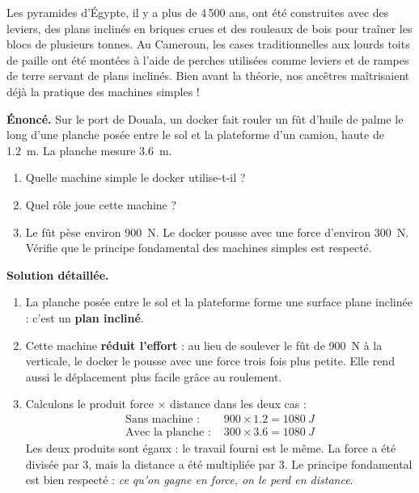 \documentclass[11pt]{article}
\begin{document}
\begin{savaistu}
Les pyramides d'Égypte, il y a plus de 4\,500 ans, ont été construites avec des leviers, des plans inclinés en briques crues et des rouleaux de bois pour traîner les blocs de plusieurs tonnes. Au Cameroun, les cases traditionnelles aux lourds toits de paille ont été montées à l'aide de perches utilisées comme leviers et de rampes de terre servant de plans inclinés. Bien avant la théorie, nos ancêtres maîtrisaient déjà la pratique des machines simples !
\end{savaistu}

\begin{exoresolu}
\textbf{Énoncé.} Sur le port de Douala, un docker fait rouler un fût d'huile de palme le long d'une planche posée entre le sol et la plateforme d'un camion, haute de \SI{1,2}{m}. La planche mesure \SI{3,6}{m}.
\begin{enumerate}
\item Quelle machine simple le docker utilise-t-il ?
\item Quel rôle joue cette machine ?
\item Le fût pèse environ \SI{900}{N}. Le docker pousse avec une force d'environ \SI{300}{N}. Vérifie que le principe fondamental des machines simples est respecté.
\end{enumerate}
\tcblower
\textbf{Solution détaillée.}
\begin{enumerate}
\item La planche posée entre le sol et la plateforme forme une surface plane inclinée : c'est un \textbf{plan incliné}.
\item Cette machine \textbf{réduit l'effort} : au lieu de soulever le fût de \SI{900}{N} à la verticale, le docker le pousse avec une force trois fois plus petite. Elle rend aussi le déplacement plus facile grâce au roulement.
\item Calculons le produit force $\times$ distance dans les deux cas :
\begin{align*}
\text{Sans machine : } & 900 \times \num{1,2} = \SI{1080}{J} \\
\text{Avec la planche : } & 300 \times \num{3,6} = \SI{1080}{J}
\end{align*}
Les deux produits sont égaux : le travail fourni est le même. La force a été divisée par 3, mais la distance a été multipliée par 3. Le principe fondamental est bien respecté : \emph{ce qu'on gagne en force, on le perd en distance}.
\end{enumerate}
\end{exoresolu}
\end{document}
